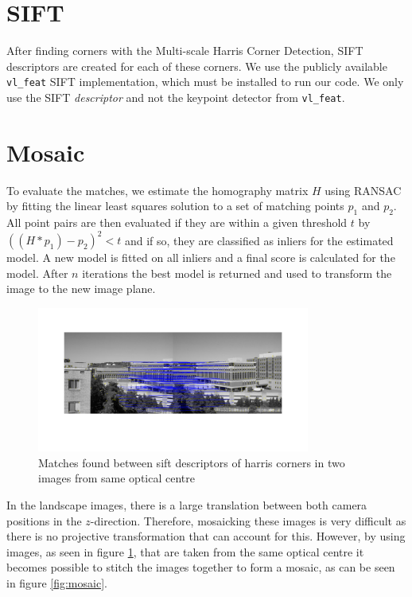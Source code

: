 \documentclass[a4paper,10pt]{article}
\begin{document}
\section{SIFT}
After finding corners with the Multi-scale Harris Corner Detection, SIFT descriptors are created for each of these corners.
We use the publicly available \verb+vl_feat+ SIFT implementation, which must be installed to run our code.
We only use the SIFT \emph{descriptor} and not the keypoint detector from \verb+vl_feat+.



\section{Mosaic}
To evaluate the matches, we estimate the homography matrix $H$ using RANSAC by fitting the linear least squares solution to a set of matching points $p_1$ and $p_2$. All point pairs are then evaluated if they are within a given threshold $t$ by $((H*p_1)-p_2)^2 < t$ and if so, they are classified as inliers for the estimated model. A new model is fitted on all inliers and a final score is calculated for the model. After $n$ iterations the best model is returned and used to transform the image to the new image plane. 

\begin{figure}[h!t]
\centering
\includegraphics[width=0.8\textwidth]{img/mosaicmatch}
\caption{Matches found between sift descriptors of harris corners in two images from same optical centre}
\label{fig:mosaicmatch}
\end{figure}

In the landscape images, there is a large translation between both camera positions in the $z$-direction. Therefore, mosaicking these images is very difficult as there is no projective transformation that can account for this. However, by using images, as seen in figure \ref{fig:mosaicmatch}, that are taken from the same optical centre it becomes possible to stitch the images together to form a mosaic, as can be seen in figure \ref{fig:mosaic}.
\end{document}

